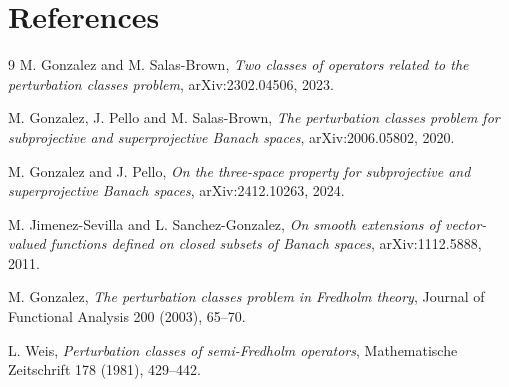 \documentclass[11pt]{article}
\begin{document}
\section*{References}

\begin{thebibliography}{9}
M. Gonzalez and M. Salas-Brown,
\emph{Two classes of operators related to the perturbation classes problem},
arXiv:2302.04506, 2023.

M. Gonzalez, J. Pello and M. Salas-Brown,
\emph{The perturbation classes problem for subprojective and superprojective
Banach spaces}, arXiv:2006.05802, 2020.

M. Gonzalez and J. Pello,
\emph{On the three-space property for subprojective and superprojective
Banach spaces}, arXiv:2412.10263, 2024.

M. Jimenez-Sevilla and L. Sanchez-Gonzalez,
\emph{On smooth extensions of vector-valued functions defined on closed
subsets of Banach spaces}, arXiv:1112.5888, 2011.

M. Gonzalez,
\emph{The perturbation classes problem in Fredholm theory},
Journal of Functional Analysis 200 (2003), 65--70.

L. Weis,
\emph{Perturbation classes of semi-Fredholm operators},
Mathematische Zeitschrift 178 (1981), 429--442.
\end{thebibliography}
\end{document}

